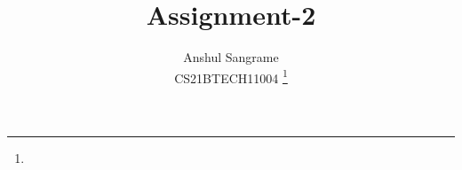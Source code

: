 \documentclass[journal,12pt,twocolumn]{IEEEtran}
\DeclareMathOperator*{\Res}{Res}
\begin{document}
\newcommand{\BEQA}{\begin{eqnarray}}
\newcommand{\EEQA}{\end{eqnarray}}
\newcommand{\define}{\stackrel{\triangle}{=}}
\newcommand*\circled[1]{\tikz[baseline=(char.base)]{
    \node[shape=circle,draw,inner sep=2pt] (char) {#1};}}

\providecommand{\mbf}{\mathbf}
\providecommand{\pr}[1]{\ensuremath{\Pr\left(#1\right)}}
\providecommand{\qfunc}[1]{\ensuremath{Q\left(#1\right)}}
\providecommand{\sbrak}[1]{\ensuremath{{}\left[#1\right]}}
\providecommand{\lsbrak}[1]{\ensuremath{{}\left[#1\right.}}
\providecommand{\rsbrak}[1]{\ensuremath{{}\left.#1\right]}}
\providecommand{\brak}[1]{\ensuremath{\left(#1\right)}}
\providecommand{\lbrak}[1]{\ensuremath{\left(#1\right.}}
\providecommand{\rbrak}[1]{\ensuremath{\left.#1\right)}}
\providecommand{\cbrak}[1]{\ensuremath{\left\{#1\right\}}}
\providecommand{\lcbrak}[1]{\ensuremath{\left\{#1\right.}}
\providecommand{\rcbrak}[1]{\ensuremath{\left.#1\right\}}}
\theoremstyle{remark}
\newtheorem{rem}{Remark}
\newcommand{\sgn}{\mathop{\mathrm{sgn}}}
\providecommand{\abs}[1]{\left\vert#1\right\vert}
\providecommand{\res}[1]{\Res\displaylimits_{#1}} 
\providecommand{\norm}[1]{\left\lVert#1\right\rVert}
\providecommand{\mtx}[1]{\mathbf{#1}}
\providecommand{\mean}[1]{E\left[ #1 \right]}
\providecommand{\fourier}{\overset{\mathcal{F}}{ \rightleftharpoons}}
\providecommand{\system}{\overset{\mathcal{H}}{ \longleftrightarrow}}
\newcommand{\solution}{\noindent \textbf{Solution: }}
\newcommand{\cosec}{\,\text{cosec}\,}
\providecommand{\dec}[2]{\ensuremath{\overset{#1}{\underset{#2}{\gtrless}}}}
\newcommand{\myvec}[1]{\ensuremath{\begin{pmatrix}#1\end{pmatrix}}}
\newcommand{\mydet}[1]{\ensuremath{\begin{vmatrix}#1\end{vmatrix}}}
\newcommand*{\permcomb}[4][0mu]{{{}^{#3}\mkern#1#2_{#4}}}
\newcommand*{\perm}[1][-3mu]{\permcomb[#1]{P}}
\newcommand*{\comb}[1][-1mu]{\permcomb[#1]{C}}
\makeatletter
{}
\makeatother
\let\StandardTheFigure\thefigure
\let\vec\mathbf
\renewcommand{\thefigure}{\theproblem}
\def\putbox#1#2#3{\makebox[0in][l]{\makebox[#1][l]{}\raisebox{\baselineskip}[0in][0in]{\raisebox{#2}[0in][0in]{#3}}}}
     \def\rightbox#1{\makebox[0in][r]{#1}}
     \def\centbox#1{\makebox[0in]{#1}}
     \def\topbox#1{\raisebox{-\baselineskip}[0in][0in]{#1}}
     \def\midbox#1{\raisebox{-0.5\baselineskip}[0in][0in]{#1}}
\vspace{3cm}
\title{Assignment-2}
\author{Anshul Sangrame\\CS21BTECH11004
	\thanks{}
}
\end{document}

